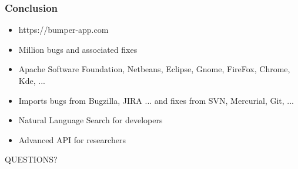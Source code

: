 \documentclass{beamer}
\begin{document}
\begin{frame}
\frametitle{Conclusion}

\begin{itemize}
\item https://bumper-app.com
\item Million bugs and associated fixes
\item Apache Software Foundation, Netbeans, Eclipse, Gnome, FireFox, Chrome, Kde, ...
\item Imports bugs from Bugzilla, JIRA  ... and fixes from SVN, Mercurial, Git, ...
\item Natural Language Search for developers
\item Advanced API for researchers
\end{itemize}



\end{frame}




\begin{frame}
\Huge{\centerline{QUESTIONS?}}
\end{frame}

\end{document}

